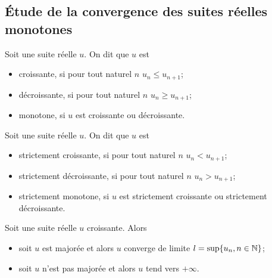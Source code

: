 \subsection{Étude de la convergence des suites réelles monotones}

\begin{defdef}
  Soit une suite réelle \(u\). On dit que \(u\) est
  \begin{itemize}
  \item croissante, si pour tout naturel \(n\) \(u_n \leqslant u_{n+1}\);
  \item décroissante, si pour tout naturel \(n\) \(u_n \geqslant u_{n+1}\);
  \item monotone, si \(u\) est croissante ou décroissante.
  \end{itemize}
\end{defdef}
\begin{defdef}
  Soit une suite réelle \(u\). On dit que \(u\) est
  \begin{itemize}
  \item strictement croissante, si pour tout naturel \(n\) \(u_n < u_{n+1}\);
  \item strictement décroissante, si pour tout naturel \(n\) \(u_n > u_{n+1}\);
  \item strictement monotone, si \(u\) est strictement croissante ou strictement décroissante.
  \end{itemize}
\end{defdef}
\begin{theo}
  Soit une suite réelle \(u\) croissante. Alors
  \begin{itemize}
  \item soit \(u\) est majorée et alors \(u\) converge de limite \(l=\sup\{u_n, n \in \mathbb{N}\}\);
  \item soit \(u\) n'est pas majorée et alors \(u\) tend vers \(+\infty\).
  \end{itemize}
\end{theo}
